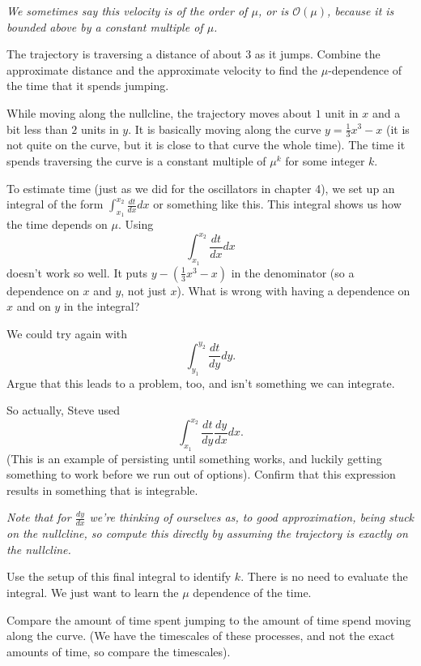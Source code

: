 \documentclass[12pt,letterpaper,noanswers]{exam}
\begin{document}
\begin{questions}
\begin{parts}
\emph{We sometimes say this velocity is of the order of $\mu$, or is $\mathcal{O}(\mu)$, because it is bounded above by a constant multiple of $\mu$.}

\item The trajectory is traversing a
distance of about $3$ as it jumps.  Combine the approximate distance and the approximate velocity to find the $\mu$-dependence of the time that it spends jumping.
\item While moving along the nullcline, the trajectory moves about $1$ unit in $x$ and a bit less than $2$ units in $y$.  It is basically moving along the curve
$y = \frac{1}{3}x^3-x$ (it is not quite on the curve, but it is close to that curve the whole time).  The time it spends 
traversing the curve is a constant multiple of $\mu^k$ for some integer $k$.  


To estimate time (just as we did for the oscillators in chapter 4), we set up an integral of the form $\displaystyle\int_{x_1}^{x_2} \frac{dt}{dx}dx$
or something like this.  This integral shows us how the time depends on $\mu$.  Using  \[\int_{x_1}^{x_2} \frac{dt}{dx}dx\]
doesn't work so well.  It
puts $y-(\frac{1}{3}x^3-x)$ in the denominator (so a dependence on $x$ and $y$, not just $x$).
What is wrong with having a dependence on $x$ and on $y$ in the integral?

\item We could try again with \[\int_{y_1}^{y_2} \frac{dt}{dy}dy.\]  Argue that this leads to a problem, too, and isn't something we can integrate.

\item 
So actually, Steve used \[\int_{x_1}^{x_2} \frac{dt}{dy}\frac{dy}{dx}dx.\]  
(This is an example of persisting until something works, and luckily getting something to work before we run out of options).  Confirm that this expression results in something that is integrable.

\emph{Note that for $\frac{dy}{dx}$ we're thinking of ourselves as, to good approximation, being
stuck on the nullcline, so compute this directly by assuming the trajectory is exactly on the nullcline.}

\item
Use the setup of this final integral to identify $k$.  There is no need to evaluate the integral.  We just want to learn the $\mu$ dependence of the time.  
\item Compare the amount of time spent jumping to the amount of time spend moving along the curve.  (We have the timescales
of these processes, and not the exact amounts of time, so compare the timescales).
\end{parts}



\end{questions}
\end{document}
